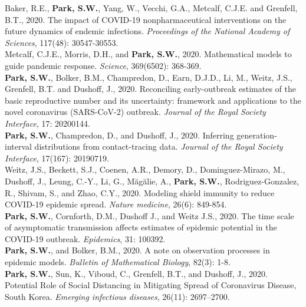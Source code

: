 \documentclass[11pt]{article} %
\begin{document}
 Baker, R.E., \textbf{Park, S.W.}, Yang, W., Vecchi, G.A., Metcalf, C.J.E. and Grenfell, B.T., 2020. The impact of COVID-19 nonpharmaceutical interventions on the future dynamics of endemic infections. \textit{Proceedings of the National Academy of Sciences}, 117(48): 30547-30553.\\

 Metcalf, C.J.E., Morris, D.H., and \textbf{Park, S.W.}, 2020. Mathematical models to guide pandemic response. \textit{Science}, 369(6502): 368-369.\\

 \textbf{Park, S.W.}, Bolker, B.M., Champredon, D., Earn, D.J.D., Li, M., Weitz, J.S., Grenfell, B.T. and Dushoff, J., 2020. Reconciling early-outbreak estimates of the basic reproductive number and its uncertainty: framework and applications to the novel coronavirus (SARS-CoV-2) outbreak. \textit{Journal of the Royal Society Interface}, 17: 20200144.\\

 \textbf{Park, S.W.}, Champredon, D., and Dushoff, J., 2020. Inferring generation-interval distributions from contact-tracing data. \textit{Journal of the Royal Society Interface}, 17(167): 20190719.\\

 Weitz, J.S., Beckett, S.J., Coenen, A.R., Demory, D., Dominguez-Mirazo, M., Dushoff, J., Leung, C.-Y., Li, G., Măgălie, A., \textbf{Park, S.W.}, Rodriguez-Gonzalez, R., Shivam, S., and Zhao, C.Y., 2020. Modeling shield immunity to reduce COVID-19 epidemic spread. \textit{Nature medicine}, 26(6): 849-854.\\

 \textbf{Park, S.W.}, Cornforth, D.M., Dushoff J., and Weitz J.S., 2020. The time scale of asymptomatic transmission affects estimates of epidemic potential in the COVID-19 outbreak. \textit{Epidemics}, 31: 100392.\\

 \textbf{Park, S.W.}, and Bolker, B.M., 2020. A note on observation processes in epidemic models. \textit{Bulletin of Mathematical Biology}, 82(3): 1-8.\\

 \textbf{Park, S.W.}, Sun, K., Viboud, C., Grenfell, B.T., and Dushoff, J., 2020. Potential Role of Social Distancing in Mitigating Spread of Coronavirus Disease, South Korea. \textit{Emerging infectious diseases}, 26(11): 2697–2700.\\
\end{document}
